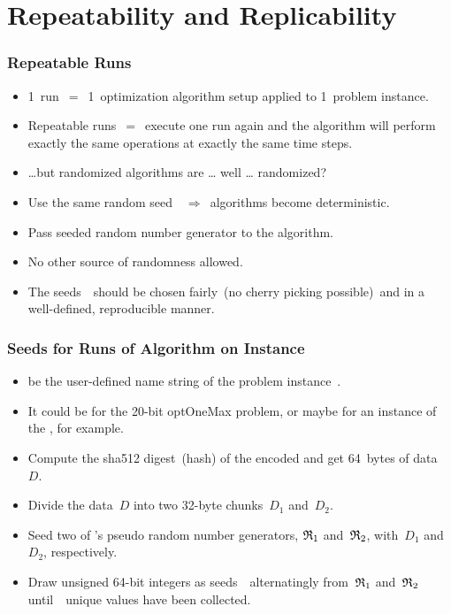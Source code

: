 \documentclass[aspectratio=169,mathserif,notheorems]{beamer}%
\begin{document}
\section{Repeatability and Replicability}%
%
\begin{frame}%
\frametitle{Repeatable Runs}%
\begin{itemize}%
\item 1~run~$=$~1~optimization algorithm setup applied to 1~problem instance.%
%
\item<2-> Repeatable runs~$=$~execute one run again and the algorithm will perform exactly the same operations at exactly the same time steps.%
%
\item<3-> {\dots}but randomized algorithms are {\dots} well {\dots} randomized?%
%
\item<4-> Use the same random seed~\randomSeed~$\Longrightarrow$~algorithms become deterministic.%
%
\item<5-> Pass seeded random number generator to the algorithm.%
%
\item<6-> No other source of randomness allowed.%
%
\item<7-> The seeds~\randomSeed\ should be chosen fairly~(no cherry picking possible)~and in a well-defined, reproducible manner.%
%
\end{itemize}%
\end{frame}%
%
%
\begin{frame}%
\frametitle{Seeds {\randomSeeds} for {\nRuns} Runs of Algorithm {\varAlgorithm} on Instance {\varInstance}}%
\begin{itemize}%
\item \varName{\varInstance} be the user-defined name string of the problem instance~\varInstance.%
%
\item<2-> It could be \emph{} for the 20\nobreakdashes-bit \gls{optOneMax} problem, or maybe \emph{} for an instance of the , for example.%
%
\item<3-> Compute the \gls{sha512} digest\cite{FIPSPUB180D4}~(hash) of the  encoded\cite{RFC3629,ISOIEC106462020ITUCCSU} \varName{\varInstance} and get 64~bytes of data~$D$.%
%
\item<4-> Divide the data~$D$ into two 32-byte chunks~$D_1$ and~$D_2$.%
%
\item<5-> Seed two of \numpy’s  pseudo random number generators\cite{N2025N:PCG6BP,ON2014PAFOSFSESGAFRNG}, $\mathfrak{R}_1$ and~$\mathfrak{R}_2$, with~$D_1$ and~$D_2$, respectively.%
%
\item<6-> Draw unsigned 64\nobreakdashes-bit integers as seeds~\randomSeed\ alternatingly from~$\mathfrak{R}_1$ and~$\mathfrak{R}_2$ until~\nRuns\ unique values have been collected.%
%
\end{itemize}%
\end{frame}%
\end{document}
